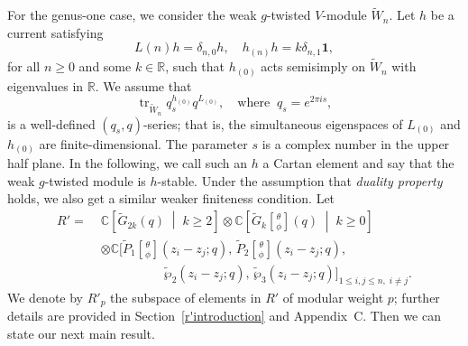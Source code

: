 \documentclass[9pt]{amsart}
\begin{document}
For the genus-one case, we consider the weak $g$-twisted $V$-module $\tilde{W}_n$. Let $h$ be a current satisfying
\[L(n)h=\delta_{n,0}h,\quad h_{(n)}h=k\delta_{n,1}\mathbf{1},\]
for all $n\geq 0$ and some $k\in \mathbb{R}$, such that $h_{(0)}$ acts semisimply on $\tilde{W}_n$ with eigenvalues in $\mathbb{R}$.
We assume that
 \[\operatorname{tr}_{\tilde{W}_n}q^{h_{(0)}}_{s}q^{L_{(0)}}, \quad \text{where}\;\;q_s=e^{2\pi i s},\] is a well-defined $(q_s,q)$-series; that is, the simultaneous eigenspaces of $L_{(0)}$ and $h_{(0)}$ are finite-dimensional. The parameter $s$ is a complex number in the upper half plane. In the following, we call such an $h$ a Cartan element and say that the weak $g$-twisted module is $h$-stable. Under the assumption that {\em duality property} holds, we also get a similar weaker finiteness condition.  Let 
 \begin{align*}
R' =\;
& \mathbb{C}\left[\tilde{G}_{2k}(q) \;\middle|\; k \geq 2 \right] 
  \otimes \mathbb{C}\left[\tilde{G}_{k} \genfrac[]{0pt}{0}{\theta}{\phi}(q) \;\middle|\; k \geq 0 \right] \\
& \otimes \mathbb{C}\big[
  \tilde{P}_{1} \genfrac[]{0pt}{0}{\theta}{\phi}(z_{i}-z_{j};q),\,
  \tilde{P}_{2} \genfrac[]{0pt}{0}{\theta}{\phi}(z_{i}-z_{j};q), \\
& \hspace{5em}
  \tilde{\wp}_{2}(z_i - z_j;q),\,
  \tilde{\wp}_3(z_i - z_j;q)
\big]_{1 \leq i, j \leq n,\; i \neq j}.
\end{align*}
 We denote by \( R'_p \) the subspace of elements in \( R' \) of modular weight \( p \); further details are provided in Section~\ref{r'introduction} and Appendix~C. Then we can state our next main result. 
 
  
 
\end{document}
